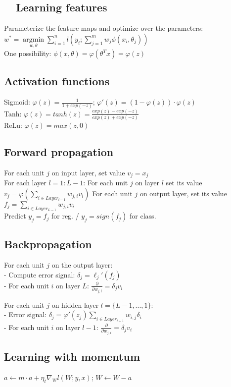 \subsection*{ ~~Learning features}

Parameterize the feature maps and optimize over the parameters:\\
$w^* = \underset{w, \theta}{\operatorname{argmin}} \sum_{i=1}^n l(y_i; \sum_{j=1}^m w_j \phi(x_i, \theta_j))$\\
One possibility: $\phi(x,\theta) = \varphi(\theta^T x) = \varphi(z)$

\subsection*{Activation functions}
Sigmoid: $\varphi(z) = \frac{1}{1+exp(-z)}$;  $\varphi'(z) = (1 - \varphi(z))\cdot\varphi(z)$\\
Tanh: $\varphi(z) = tanh(z) = \frac{exp(z)-exp(-z)}{exp(z)+exp(-z)}$\\
ReLu:  $\varphi(z) = max(z,0)$

\subsection*{Forward propagation}
For each unit $j$ on input layer, set value $v_j=x_j$\\
For each layer $l=1:L-1$: For each unit $j$ on layer $l$ set its value $v_j = \varphi(\sum_{i\in Layer_{l-1}} w_{j,i}v_i)$
For each unit $j$ on output layer, set its value $f_j = \sum_{i\in Layer_{L-1}} w_{j,i}v_i$\\
Predict $y_j = f_j$ for reg. / $y_j = sign(f_j)$ for class.

\subsection*{Backpropagation}
For each unit $j$ on the output layer:\\
- Compute error signal: $\delta_j = \ell_j'(f_j)$\\
- For each unit $i$ on layer $L$: $\frac{\partial}{\partial w_{j,i}} = \delta_j v_i$

For each unit $j$ on hidden layer $l=\{L-1,...,1\}$:\\
- Error signal: $\delta_j = \varphi'(z_j) \sum_{i\in Layer_{l+1}} w_{i,j}\delta_i$\\
- For each unit $i$ on layer $l-1$: $\frac{\partial}{\partial w_{j,i}} = \delta_j v_i$

\subsection*{Learning with momentum}
$a \leftarrow m \cdot a + \eta_t \nabla_W l(W;y,x)$; $W \leftarrow W - a$